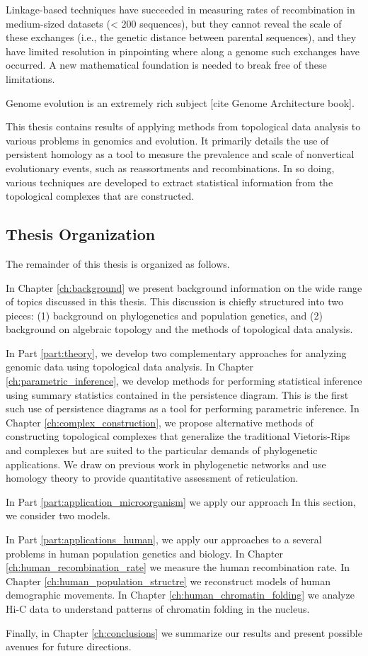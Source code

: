 Linkage-based techniques have succeeded in measuring rates of recombination in medium-sized datasets (< 200 sequences), but they cannot reveal the scale of these exchanges (i.e., the genetic distance between parental sequences), and they have limited resolution in pinpointing where along a genome such exchanges have occurred.
A new mathematical foundation is needed to break free of these limitations.

Genome evolution is an extremely rich subject [cite Genome Architecture book].

This thesis contains results of applying methods from topological data analysis to various problems in genomics and evolution.
It primarily details the use of persistent homology as a tool to measure the prevalence and scale of nonvertical evolutionary events, such as reassortments and recombinations.
In so doing, various techniques are developed to extract statistical information from the topological complexes that are constructed.

\subsection{Thesis Organization}

The remainder of this thesis is organized as follows.

In Chapter \ref{ch:background} we present background information on the wide range of topics discussed in this thesis.
This discussion is chiefly structured into two pieces: (1) background on phylogenetics and population genetics, and (2) background on algebraic topology and the methods of topological data analysis.

In Part \ref{part:theory}, we develop two complementary approaches for analyzing genomic data using topological data analysis.
In Chapter \ref{ch:parametric_inference}, we develop methods for performing statistical inference using summary statistics contained in the persistence diagram.
This is the first such use of persistence diagrams as a tool for performing parametric inference.
In Chapter \ref{ch:complex_construction}, we propose alternative methods of constructing topological complexes that generalize the traditional Vietoris-Rips and \Cech complexes but are suited to the particular demands of phylogenetic applications.
We draw on previous work in phylogenetic networks and use homology theory to provide quantitative assessment of reticulation.

In Part \ref{part:application_microorganism} we apply our approach 
In this section, we consider two models.

In Part \ref{part:applications_human}, we apply our approaches to a several problems in human population genetics and biology.
In Chapter \ref{ch:human_recombination_rate} we measure the human recombination rate.
In Chapter \ref{ch:human_population_structre} we reconstruct models of human demographic movements.
In Chapter \ref{ch:human_chromatin_folding} we analyze Hi-C data to understand patterns of chromatin folding in the nucleus.

Finally, in Chapter \ref{ch:conclusions} we summarize our results and present possible avenues for future directions.